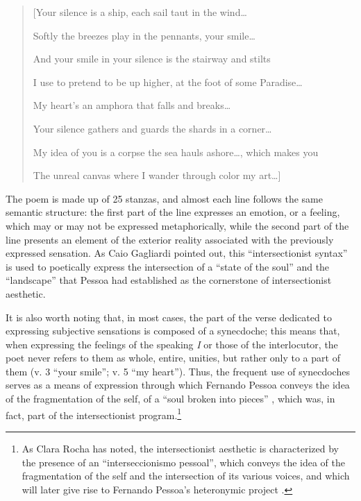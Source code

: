 \begin{paper}
\begin{quote}
\vspace{1em}

\begin{minipage}{.9\textwidth}    
[Your silence is a ship, each sail taut in the wind\ldots{}

Softly the breezes play in the pennants, your smile\ldots{}

And your smile in your silence is the stairway and stilts

I use to pretend to be up higher, at the foot of some Paradise\ldots{}

My heart's an amphora that falls and breaks\ldots{}

Your silence gathers and guards the shards in a corner\ldots{}

My idea of you is a corpse the sea hauls ashore\ldots{}, which makes you

The unreal canvas where I wander through color my art\ldots{}]

\begin{flushright}
    \parencite[134]{pessoa_poems_1986}
\end{flushright}
\end{minipage}
\end{quote}


\noindent The poem is made up of 25 stanzas, and almost each line follows the same
semantic structure: the first part of the line expresses an
emotion, or a feeling, which may or may not be expressed metaphorically,
while the second part of the line presents an element of the exterior
reality associated with the previously expressed sensation. As Caio
Gagliardi pointed out, this ``intersectionist syntax'' \parencite[97]{gagliardi_fernando_2005} is
used to poetically express the intersection of a ``state of the soul''
and the ``landscape'' that Pessoa had established as the cornerstone of
intersectionist aesthetic.

It is also worth noting that, in most cases, the part of the verse
dedicated to expressing subjective sensations is composed of a
synecdoche; this means that, when expressing the feelings of the
speaking \emph{I} or those of the interlocutor, the poet never refers to
them as whole, entire, unities, but rather only to a part of them (v. 3
``your smile''; v. 5 ``my heart''). Thus, the frequent use of
synecdoches serves as a means of expression through which Fernando
Pessoa conveys the idea of the fragmentation of the self, of a ``soul
broken into pieces'' \parencite[152]{pessoa_sensacionismo_2009}, which was, in fact, part of the
intersectionist program.\footnote{As Clara Rocha has noted, the
  intersectionist aesthetic is characterized by the presence of an
  ``interseccionismo pessoal'', which conveys the idea of the
  fragmentation of the self and the intersection of its various voices,
  and which will later give rise to Fernando Pessoa's heteronymic
  project \parencite[259]{rocha_revistas_1985}.}


\end{paper}
